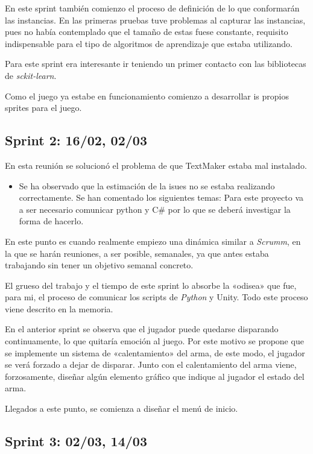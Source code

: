 En este sprint también comienzo el proceso de definición de lo que conformarán las instancias. En las primeras pruebas tuve problemas al capturar las instancias, pues no había contemplado que el tamaño de estas fuese constante, requisito indispensable para el tipo de algoritmos de aprendizaje que estaba utilizando.

Para este sprint era interesante ir teniendo un primer contacto con las bibliotecas de \emph{sckit-learn}.

Como el juego ya estabe en funcionamiento comienzo a desarrollar is propios sprites para el juego.


\subsection{Sprint 2:  16/02, 02/03}

 En esta reunión se solucionó el problema de que TextMaker estaba mal instalado.
\begin{itemize}
    \item Se ha observado que la estimación de la isues no se estaba realizando correctamente.
    Se han comentado los siguientes temas: Para este proyecto va a ser necesario comunicar python y C\# por lo que se deberá investigar la forma de hacerlo.
\end{itemize}

En este punto es cuando realmente empiezo una dinámica similar a \emph{Scrumm}, en la que se harán reuniones, a ser posible, semanales, ya que antes estaba trabajando sin tener un objetivo semanal concreto.

El grueso del trabajo y el tiempo de este sprint lo absorbe la «odisea» que fue, para mi, el proceso de comunicar los scripts de \emph{Python} y Unity. Todo este proceso viene descrito en la memoria.

En el anterior sprint se observa que el jugador puede quedarse disparando continuamente, lo que quitaría emoción al juego. Por este motivo se propone que se implemente un sistema de «calentamiento» del arma, de este modo, el jugador se verá forzado a dejar de disparar. Junto con el calentamiento del arma viene, forzosamente, diseñar algún elemento gráfico que indique al jugador el estado del arma.

Llegados a este punto, se comienza a diseñar el menú de inicio.


\subsection{Sprint 3:  02/03, 14/03}


